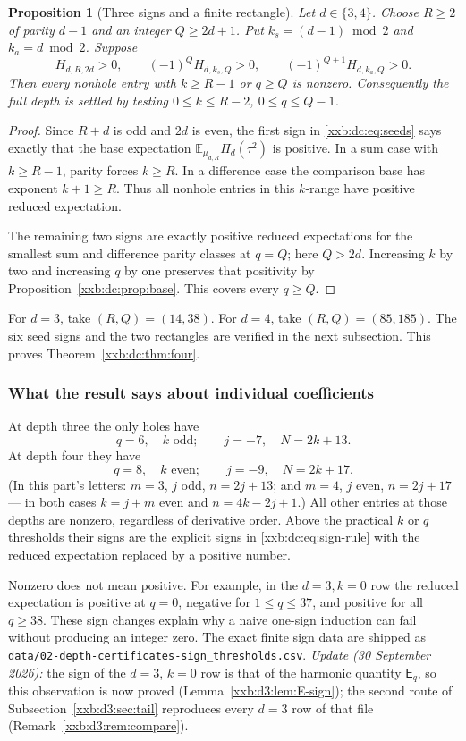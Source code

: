 \documentclass[11pt,a4paper]{article}
\numberwithin{equation}{section}
\newtheorem{proposition}[theorem]{Proposition}
\theoremstyle{definition}
\theoremstyle{remark}
\theoremstyle{plain}
\begin{document}
\begin{proposition}[Three signs and a finite rectangle]\label{xxb:dc:prop:smallcert}
Let $d\in\{3,4\}$.  Choose $R\ge2$ of parity $d-1$ and an integer
$Q\ge2d+1$.  Put $k_s=(d-1)\bmod2$ and $k_a=d\bmod2$.
Suppose
\begin{equation}\label{xxb:dc:eq:seeds}
 H_{d,R,2d}>0,\qquad
 (-1)^QH_{d,k_s,Q}>0,\qquad
 (-1)^{Q+1}H_{d,k_a,Q}>0.
\end{equation}
Then every nonhole entry with $k\ge R-1$ or $q\ge Q$ is nonzero.
Consequently the full depth is settled by testing
$0\le k\le R-2$, $0\le q\le Q-1$.
\end{proposition}
\begin{proof}
Since $R+d$ is odd and $2d$ is even, the first sign in
\eqref{xxb:dc:eq:seeds} says exactly that the base expectation
$\mathbb E_{\mu_{d,R}}\Pi_d(\tau^2)$ is positive.  In a sum case with
$k\ge R-1$, parity forces $k\ge R$.  In a difference case the comparison base
has exponent $k+1\ge R$.  Thus all nonhole entries in this $k$-range have
positive reduced expectation.

The remaining two signs are exactly positive reduced expectations for
the smallest sum and difference parity classes at $q=Q$; here
$Q>2d$.  Increasing $k$ by two and increasing $q$ by one preserves that
positivity by Proposition~\ref{xxb:dc:prop:base}.  This covers every $q\ge Q$.
\end{proof}

For $d=3$, take $(R,Q)=(14,38)$.  For $d=4$, take $(R,Q)=(85,185)$.
The six seed signs and the two rectangles are verified in the next
subsection.  This proves Theorem~\ref{xxb:dc:thm:four}.

\subsubsection{What the result says about individual coefficients}
At depth three the only holes have
\[
 q=6,\quad k\text{ odd};\qquad
 j=-7,\quad N=2k+13.
\]
At depth four they have
\[
 q=8,\quad k\text{ even};\qquad
 j=-9,\quad N=2k+17.
\]
(In this part's letters: $m=3$, $j$ odd, $n=2j+13$; and $m=4$, $j$ even,
$n=2j+17$ --- in both cases $k=j+m$ even and $n=4k-2j+1$.)
All other entries at those depths are nonzero, regardless of derivative
order.  Above the practical $k$ or $q$ thresholds their signs are the
explicit signs in \eqref{xxb:dc:eq:sign-rule} with the reduced expectation
replaced by a positive number.

Nonzero does not mean positive.  For example, in the $d=3,k=0$ row the
reduced expectation is positive at $q=0$, negative for $1\le q\le37$,
and positive for all $q\ge38$.  These sign changes explain why a naive
one-sign induction can fail without producing an integer zero.  The exact
finite sign data are shipped as
\texttt{data/02-depth-\allowbreak certificates-\allowbreak sign\_thresholds.csv}.
\emph{Update (30 September 2026):} the sign of the $d=3$, $k=0$ row is that
of the harmonic quantity $\mathsf E_q$, so this observation is now proved
(Lemma~\ref{xxb:d3:lem:E-sign}); the second route of
Subsection~\ref{xxb:d3:sec:tail} reproduces every $d=3$ row of that file
(Remark~\ref{xxb:d3:rem:compare}).
\end{document}
